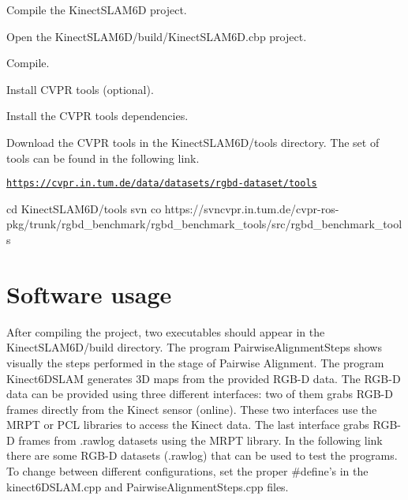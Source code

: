 \begin{DoxyItemize}
\item Compile the KinectSLAM6D project.
\begin{DoxyEnumerate}
\item Open the KinectSLAM6D/build/KinectSLAM6D.cbp project.
\item Compile.
\end{DoxyEnumerate}
\end{DoxyItemize}


\begin{DoxyItemize}
\item Install CVPR tools (optional).
\begin{DoxyEnumerate}
\item Install the CVPR tools dependencies.
\item Download the CVPR tools in the KinectSLAM6D/tools directory. The set of tools can be found in the following link. \par
 \href{https://cvpr.in.tum.de/data/datasets/rgbd-dataset/tools}{\tt https://cvpr.in.tum.de/data/datasets/rgbd-\/dataset/tools} \begin{DoxyVerb}
cd KinectSLAM6D/tools
svn co https://svncvpr.in.tum.de/cvpr-ros-pkg/trunk/rgbd_benchmark/rgbd_benchmark_tools/src/rgbd_benchmark_tools
\end{DoxyVerb}

\end{DoxyEnumerate}
\end{DoxyItemize}\hypertarget{index_usage_sec}{}\section{Software usage}\label{index_usage_sec}
After compiling the project, two executables should appear in the KinectSLAM6D/build directory. The program PairwiseAlignmentSteps shows visually the steps performed in the stage of Pairwise Alignment. The program Kinect6DSLAM generates 3D maps from the provided RGB-\/D data. The RGB-\/D data can be provided using three different interfaces: two of them grabs RGB-\/D frames directly from the Kinect sensor (online). These two interfaces use the MRPT or PCL libraries to access the Kinect data. The last interface grabs RGB-\/D frames from .rawlog datasets using the MRPT library. In the following link there are some RGB-\/D datasets (.rawlog) that can be used to test the programs. To change between different configurations, set the proper \#define's in the kinect6DSLAM.cpp and PairwiseAlignmentSteps.cpp files.

